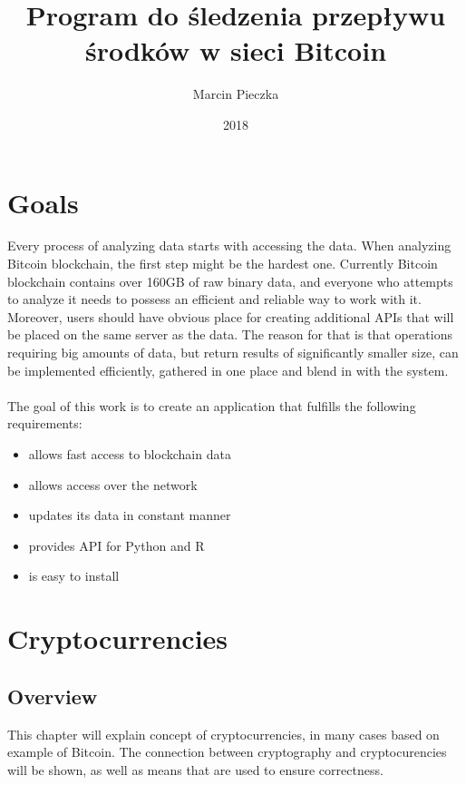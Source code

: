 \documentclass[12pt, en, eng, oneside]{mgr}
\begin{document}
\title{Program do śledzenia przepływu środków w sieci Bitcoin}
\date{2018}
\author{Marcin Pieczka}
\maketitle

\tableofcontents

\chapter{Goals}

Every process of analyzing data starts with accessing the data. When analyzing Bitcoin blockchain, the first step might be the hardest one. Currently Bitcoin blockchain contains over 160GB of raw binary data, and everyone who attempts to analyze it needs to possess an efficient and reliable way to work with it. Moreover, users should have obvious place for creating additional APIs that will be placed on the same server as the data. The reason for that is that operations requiring big amounts of data, but return results of significantly smaller size, can be implemented efficiently, gathered in one place and blend in with the system. 
\\
\\
The goal of this work is to create an application that fulfills the following requirements: 
\begin{itemize}

\item
allows fast access to blockchain data
\item
allows access over the network
\item
updates its data in constant manner
\item
provides API for Python and R
\item
is easy to install

\end{itemize}

\chapter{Cryptocurrencies}

\section{Overview}
This chapter will explain concept of cryptocurrencies, in many cases based on example of Bitcoin. The connection between cryptography and cryptocurencies will be shown, as well as means that are used to ensure correctness.
\end{document}
